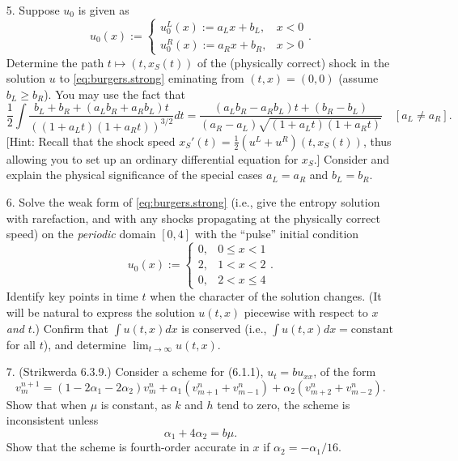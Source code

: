 \documentclass{article}
\begin{document}
\begin{itemize}
\item[5.] Suppose $u_0$ is given as
\begin{equation*}
u_0(x) := \begin{cases} u^L_0(x) := a_L x + b_L, & x < 0 \\ u^R_0(x) := a_R x + b_R, & x > 0 \end{cases}.
\end{equation*}
Determine the path $t \mapsto \left( t, x_S(t) \right)$ of the (physically correct) shock in the solution $u$ to \eqref{eq:burgers.strong} eminating from $(t,x) = (0,0)$ (assume $b_L \geq b_R$). You may use the fact that
\begin{equation*}
\frac{1}{2} \int \frac{b_L + b_R + \left( a_L b_R + a_R b_L \right) t}{\left( \left( 1 + a_L t \right) \left( 1 + a_R t \right) \right)^{3/2}} dt = \frac{\left( a_L b_R - a_R b_L \right) t + \left( b_R - b_L \right)}{\left( a_R - a_L \right) \sqrt{\left( 1 + a_L t \right) \left( 1 + a_R t \right)}} \quad \left[ a_L \neq a_R \right].
\end{equation*}
[Hint: Recall that the shock speed $x_S'(t) = \frac{1}{2} \left( u^L + u^R \right) \left( t, x_S(t) \right)$, thus allowing you to set up an ordinary differential equation for $x_S$.] Consider and explain the physical significance of the special cases $a_L = a_R$ and $b_L = b_R$.

\item[6.] Solve the weak form of \eqref{eq:burgers.strong} (i.e., give the entropy solution with rarefaction, and with any shocks propagating at the physically correct speed) on the \emph{periodic} domain $[0,4]$ with the ``pulse'' initial condition
\begin{equation}\label{eq:pulse}
u_0(x) := \begin{cases} 0, & 0 \leq x < 1 \\ 2, & 1 < x < 2 \\ 0, & 2 < x \leq 4 \end{cases}.
\end{equation}
Identify key points in time $t$ when the character of the solution changes. (It will be natural to express the solution $u(t,x)$ piecewise with respect to $x$ \emph{and} $t$.) Confirm that $\int u(t,x) dx$ is conserved (i.e., $\int u(t,x) dx = \text{constant}$ for all $t$), and determine $\lim_{t \to \infty} u(t,x)$.

\item[7.] (Strikwerda 6.3.9.) Consider a scheme for (6.1.1), $u_t = b u_{xx}$, of the form
\begin{equation*}
v^{n+1}_m = \left( 1 - 2 \alpha_1 - 2 \alpha_2 \right) v^n_m + \alpha_1 \left( v^n_{m+1} + v^n_{m-1} \right) + \alpha_2 \left( v^n_{m+2} + v^n_{m-2} \right).
\end{equation*}
Show that when $\mu$ is constant, as $k$ and $h$ tend to zero, the scheme is inconsistent unless
\begin{equation*}
\alpha_1 + 4 \alpha_2 = b \mu.
\end{equation*}
Show that the scheme is fourth-order accurate in $x$ if $\alpha_2 = -\alpha_1 / 16$.

\end{itemize}
\end{document}
